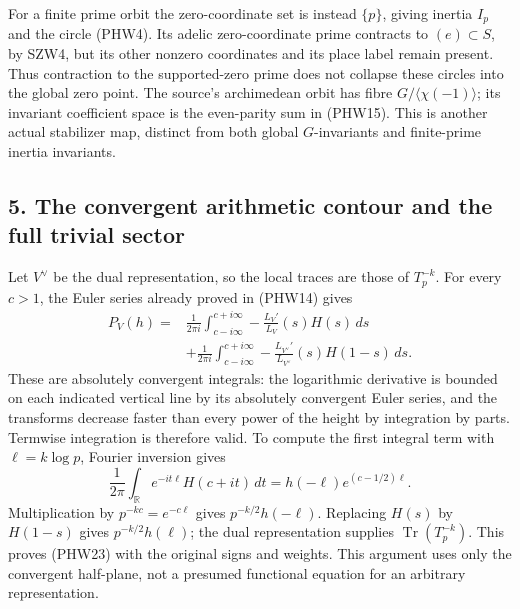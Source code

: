 \documentclass[
  10pt,
  a4paper,
]{article}
\begin{document}
For a finite prime orbit the zero-coordinate set is instead \(\{p\}\),
giving inertia \(I_p\) and the circle (PHW4). Its adelic zero-coordinate
prime contracts to \((e)\subset S\), by SZW4, but its other nonzero
coordinates and its place label remain present. Thus contraction to the
supported-zero prime does not collapse these circles into the global
zero point. The source's archimedean orbit has fibre
\(G/\langle\chi(-1)\rangle\); its invariant coefficient space is the
even-parity sum in (PHW15). This is another actual stabilizer map,
distinct from both global \(G\)-invariants and finite-prime inertia
invariants.

\subsection{5. The convergent arithmetic contour and the full trivial
sector}\label{the-convergent-arithmetic-contour-and-the-full-trivial-sector}

Let \(V^\vee\) be the dual representation, so the local traces are those
of \(T_p^{-k}\). For every \(c>1\), the Euler series already proved in
(PHW14) gives \[
\begin{aligned}
P_V(h)={}&\frac1{2\pi i}\int_{c-i\infty}^{c+i\infty}
-\frac{L_V'}{L_V}(s)H(s)\,ds\\
&+\frac1{2\pi i}\int_{c-i\infty}^{c+i\infty}
-\frac{L_{V^\vee}'}{L_{V^\vee}}(s)H(1-s)\,ds.
\end{aligned}
\tag{PHW23}
\] These are absolutely convergent integrals: the logarithmic derivative
is bounded on each indicated vertical line by its absolutely convergent
Euler series, and the transforms decrease faster than every power of the
height by integration by parts. Termwise integration is therefore valid.
To compute the first integral term with \(\ell=k\log p\), Fourier
inversion gives \[
\frac1{2\pi}\int_{\mathbb R}e^{-it\ell}H(c+it)\,dt
=h(-\ell)e^{(c-1/2)\ell}.
\] Multiplication by \(p^{-kc}=e^{-c\ell}\) gives \(p^{-k/2}h(-\ell)\).
Replacing \(H(s)\) by \(H(1-s)\) gives \(p^{-k/2}h(\ell)\); the dual
representation supplies \(\operatorname{Tr}(T_p^{-k})\). This proves
(PHW23) with the original signs and weights. This argument uses only the
convergent half-plane, not a presumed functional equation for an
arbitrary representation.
\end{document}
